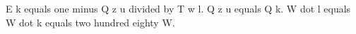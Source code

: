 E k equals one minus Q z u divided by T w l. Q z u equals Q k. W dot l equals W dot k equals two hundred eighty W.